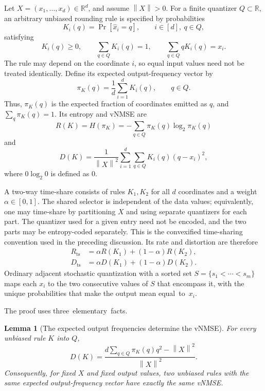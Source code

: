 \documentclass[11pt,letterpaper]{article}
\newtheorem{lemma}{Lemma}
\newcommand{\norm}[1]{\left\lVert#1\right\rVert}
\begin{document}
{Let $X=(x_1,\ldots,x_d)\in\mathbb{R}^d$, and assume $\norm{X}>0$. For a finite
quantizer $Q\subset\mathbb{R}$, an arbitrary unbiased rounding rule is
specified by probabilities
\[
K_i(q)=\Pr[\widehat{x}_i=q],
\qquad i\in[d],\ q\in Q,
\]
satisfying
\[
K_i(q)\ge 0,
\qquad
\sum_{q\in Q}K_i(q)=1,
\qquad
\sum_{q\in Q}qK_i(q)=x_i.
\]
The rule may depend on the coordinate $i$, so equal input values need not be
treated identically. Define its expected output-frequency vector by
\[
\pi_K(q)=\frac{1}{d}\sum_{i=1}^d K_i(q),
\qquad q\in Q.
\]
Thus, $\pi_K(q)$ is the expected fraction of coordinates emitted as $q$, and
$\sum_q\pi_K(q)=1$. Its entropy and vNMSE are
\[
R(K)=H(\pi_K)
=-\sum_{q\in Q}\pi_K(q)\log_2\pi_K(q)
\]and\[
D(K)=
\frac{1}{\norm{X}^2}
\sum_{i=1}^d\sum_{q\in Q}K_i(q)(q-x_i)^2,
\]where $0\log_2 0$ is defined as $0$.

A two-way time-share consists of rules $K_1,K_2$ for all $d$
coordinates and a weight $\alpha\in[0,1]$. The shared selector is independent
of the data values; equivalently, one may time-share by partitioning $X$ and using separate quantizers for each part. The quantizer used for a given entry need not be encoded, and the two parts may be
entropy-coded separately. This is the convexified time-sharing convention used
in the preceding discussion. Its rate and distortion are therefore
\begin{align*}
R_{\mathrm{ts}}
&=\alpha R(K_1)+(1-\alpha)R(K_2),\\
D_{\mathrm{ts}}
&=\alpha D(K_1)+(1-\alpha)D(K_2).
\end{align*}
Ordinary adjacent stochastic quantization with a sorted set
$S=\{s_1<\cdots<s_m\}$ maps each $x_i$ to the two consecutive values of $S$
that encompass it, with the unique probabilities that make the output mean
\mbox{equal to $x_i$.}

\adjacenttimesharingdominates*

The proof uses \mbox{three elementary facts.}

\begin{lemma}[The expected output frequencies determine the vNMSE]
\label{lem:timesharing-frequencies-determine-mse}
For every unbiased rule $K$ into $Q$,
\[
D(K)=
\frac{d\sum_{q\in Q}\pi_K(q)q^2-\norm{X}^2}{\norm{X}^2}.
\]Consequently, for fixed $X$ and fixed output values, two unbiased rules with
the same expected output-frequency vector have exactly the same vNMSE.
\end{lemma}

}
\end{document}

